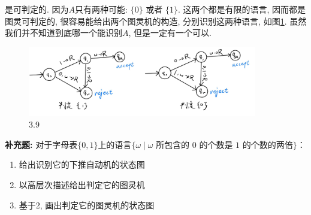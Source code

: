 \documentclass[UTF8]{report}
\newcommand{\problem}[1]{{\setlength{\parskip}{10pt}\noindent \bf{#1}}}
\newenvironment{solution}{{\noindent\hskip 2em \bf 解 \quad}}{}
\begin{document}
\begin{solution}
    是可判定的. 因为$A$只有两种可能: $\{0\}$ 或者 $\{1\}$. 这两个都是有限的语言, 因而都是图灵可判定的, 很容易能给出两个图灵机的构造, 分别识别这两种语言, 如图\ref{fig:3_9}. 虽然我们并不知道到底哪一个能识别$A$, 但是一定有一个可以.
    \begin{figure}[!htbp]
        \centering
        \includegraphics[width=10cm]{image/3.9.png}
        \caption{3.9}
        \label{fig:3_9}
    \end{figure}
\end{solution}

\problem{补充题:} 对于字母表$\{0,1\}$上的语言$\{\omega \mid \omega \text{ 所包含的 }0\text{ 的个数是 }1\text{ 的个数的两倍}\}$：
\begin{enumerate}
    \item 给出识别它的下推自动机的状态图
    \item 以高层次描述给出判定它的图灵机
    \item 基于2, 画出判定它的图灵机的状态图
\end{enumerate}
\end{document}
